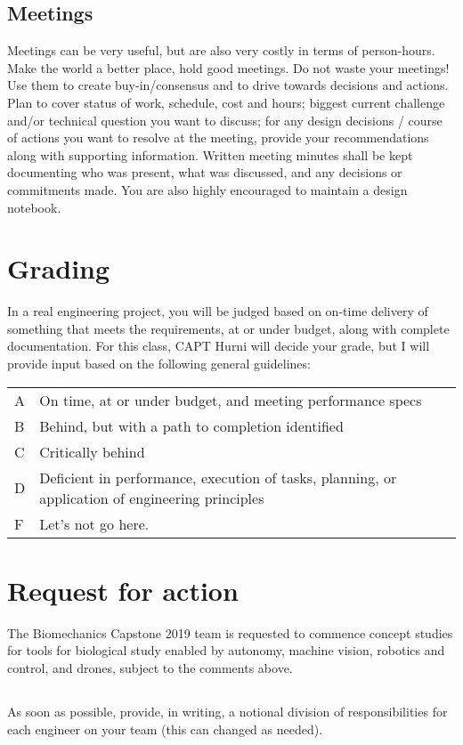 \documentclass[10pt,courier]{navymemo}
\begin{document}
\subsection{Meetings}  Meetings can be very useful, but are also very costly in terms of person-hours.  Make the world a better place, hold good meetings.  Do not waste your meetings! Use them to create buy-in/consensus and to drive towards decisions and actions. Plan to cover status of work, schedule, cost and hours; biggest current challenge and/or technical question you want to discuss; for any design decisions / course of actions you want to resolve at the meeting, provide your recommendations along with supporting information. Written meeting minutes shall be kept documenting who was present, what was discussed, and any decisions or commitments made.  You are also highly encouraged to maintain a design notebook. 

\clearpage
\section{Grading} In a real engineering project, you will be judged based on on-time delivery of something that meets the requirements, at or under budget, along with complete documentation. For this class, CAPT Hurni will decide your grade, but I will provide input based on the following general guidelines:
\begin{center}
\begin{tabular}{lp{5in}}
A & On time, at or under budget, and meeting performance specs \\
B & Behind, but with a path to completion identified \\
C & Critically behind \\
D & Deficient in performance, execution of tasks, planning, or application of engineering principles \\
F & Let's not go here. \\
\end{tabular}
\end{center}

\section{Request for action} The Biomechanics Capstone 2019 team is requested to commence concept studies for tools for biological study enabled by autonomy, machine vision, robotics and control, and drones, subject to the comments above. 

\subsection{} As soon as possible, provide, in writing, a notional division of responsibilities for each engineer on your team (this can changed as needed). 
\end{document}

